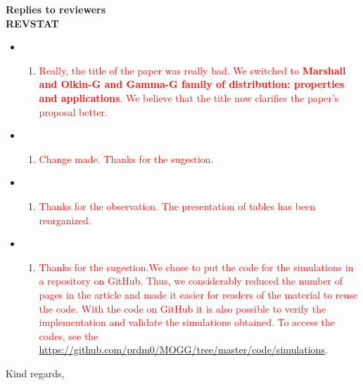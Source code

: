 \documentclass[version=last,12pt,{"maintainersDelight"},letterpaper,]{scrlttr2}
\providecommand{\tightlist}{%
  \setlength{\itemsep}{0pt}\setlength{\parskip}{0pt}}
\begin{document}
\begin{letter}{\textbf{Replies to reviewers}\\\textbf{REVSTAT}\\}
\begin{itemize}
\item
  \begin{enumerate}
  \def\labelenumi{(\roman{enumi})}
  \tightlist
  \item
    \textcolor{red}{Really, the title of the paper was really bad. We switched to \textbf{Marshall and Olkin-G and Gamma-G family of distribution: properties and applications}. We believe that the title now clarifies the paper's proposal better.}
  \end{enumerate}
\item
  \begin{enumerate}
  \def\labelenumi{(\roman{enumi})}
  \setcounter{enumi}{1}
  \tightlist
  \item
    \textcolor{red}{Change made. Thanks for the sugestion.}
  \end{enumerate}
\item
  \begin{enumerate}
  \def\labelenumi{(\roman{enumi})}
  \setcounter{enumi}{2}
  \tightlist
  \item
    \textcolor{red}{Thanks for the observation. The presentation of tables has been reorganized.}
  \end{enumerate}
\item
  \begin{enumerate}
  \def\labelenumi{(\roman{enumi})}
  \setcounter{enumi}{3}
  \tightlist
  \item
    \textcolor{red}{Thanks for the sugestion.We chose to put the code for the simulations in a repository on GitHub. Thus, we considerably reduced the number of pages in the article and made it easier for readers of the material to reuse the code. With the code on GitHub it is also possible to verify the implementation and validate the simulations obtained. To access the codes, see the
    \url{https://github.com/prdm0/MOGG/tree/master/code/simulations}}.
  \end{enumerate}
\end{itemize}

\closing{Kind regards,}




\end{letter}
\end{document}
